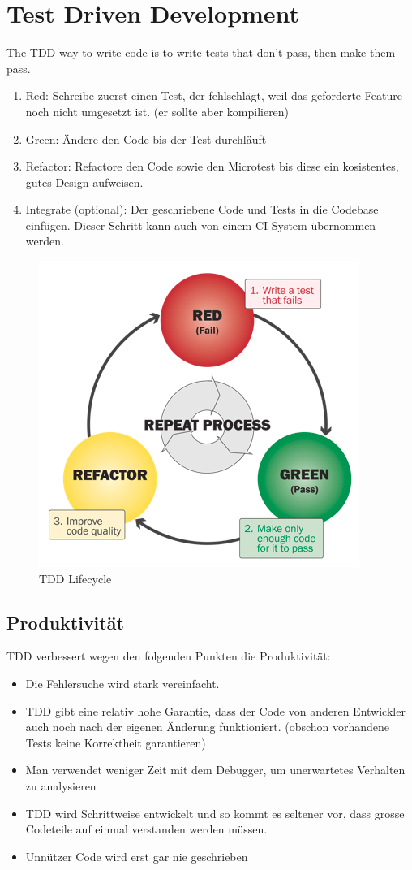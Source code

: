 \section{Test Driven Development}
The TDD way to write code is to write tests that don't pass, then make them pass.
\begin{enumerate}
	\item Red: Schreibe zuerst einen Test, der fehlschlägt, weil das geforderte Feature noch nicht umgesetzt ist. (er sollte aber kompilieren) %
	\item Green:  Ändere den Code bis der Test durchläuft
	\item Refactor: Refactore den Code sowie den Microtest bis diese ein kosistentes, gutes Design aufweisen. 
	\item Integrate (optional): Der geschriebene Code und Tests in die Codebase einfügen. Dieser Schritt kann auch von einem CI-System übernommen werden.
\end{enumerate}

\begin{figure}[h!]
	\centering
	\includegraphics[width=0.5\linewidth]{img/tdd_cycle}
	\caption{TDD Lifecycle}
	\label{fig:tddcycle}
\end{figure}

\subsection{Produktivität}
TDD verbessert wegen den folgenden Punkten die Produktivität:
\begin{itemize}
	\item Die Fehlersuche wird stark vereinfacht.
	\item TDD gibt eine relativ hohe Garantie, dass der Code von anderen Entwickler auch noch nach der eigenen Änderung funktioniert. (obschon vorhandene Tests keine Korrektheit garantieren)
	\item Man verwendet weniger Zeit mit dem Debugger, um unerwartetes Verhalten zu analysieren
	\item TDD wird Schrittweise entwickelt und so kommt es seltener vor, dass grosse Codeteile auf einmal verstanden werden müssen.
	\item Unnützer Code wird erst gar nie geschrieben
\end{itemize}

